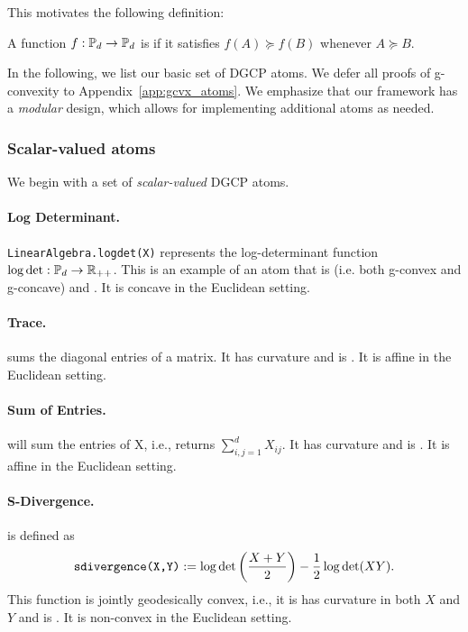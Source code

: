 \documentclass[twoside,11pt]{article}
\newcommand{\mw}[1]{\textcolor{blue}{\emph{MW: #1}}}
\begin{document}
This motivates the following definition:
\begin{definition}
    A function $f:\mathbb{P}_d \to \mathbb{P}_d$ 
    is  if it satisfies 
    $f(A) \succeq f(B)$
    whenever $A \succeq B$. 
\end{definition}
%
In the following, we list our basic set of DGCP atoms. We defer all proofs of g-convexity to Appendix~\ref{app:gcvx_atoms}. We emphasize that our framework has a \emph{modular} design, which allows for implementing additional atoms as needed. 

\subsubsection{Scalar-valued atoms}
We begin with a set of \textit{scalar-valued} DGCP atoms.
\paragraph{Log Determinant.}
 \texttt{LinearAlgebra.logdet(X)} represents the log-determinant function $\log \det: \mathbb{P}_d \to \mathbb{R}_{++}$. This is an example of an atom that is  (i.e. both g-convex and g-concave) and . It is concave in the Euclidean setting. 
 
\paragraph{Trace.}  sums the diagonal entries of a matrix. It has  curvature and is . It is affine in the Euclidean setting.

\paragraph{Sum of Entries.} 
 will sum the entries of X, i.e., returns $\sum_{i,j=1}^d X_{ij}$. It has  curvature and is . It is affine in the Euclidean setting.  

\paragraph{S-Divergence.}
 is defined as 
\[
\texttt{sdivergence(X,Y)} := \log \det \left( \frac{X+Y}{2} \right) - \frac{1}{2}\log \det (XY).
\]
This function is jointly geodesically convex, i.e., it is has  curvature in both $X$ and $Y$ and is . It is non-convex in the Euclidean setting.
\end{document}
